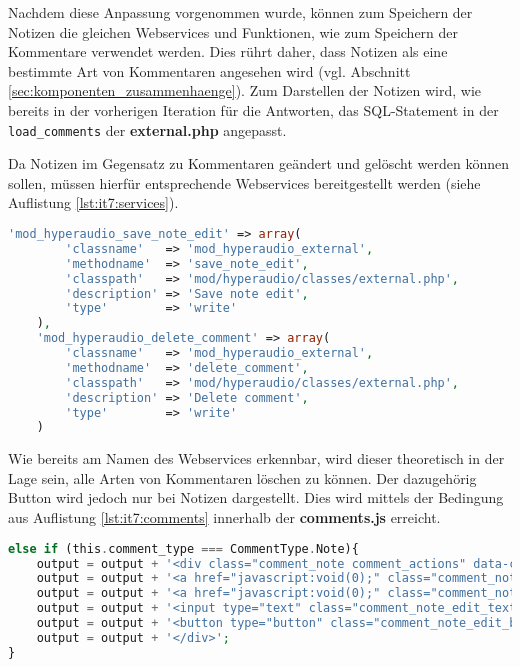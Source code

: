 Nachdem diese Anpassung vorgenommen wurde, können zum Speichern der Notizen die gleichen Webservices und Funktionen, wie zum Speichern der Kommentare verwendet werden. Dies rührt daher, dass Notizen als eine bestimmte Art von Kommentaren angesehen wird (vgl. Abschnitt \ref{sec:komponenten_zusammenhaenge}). Zum Darstellen der Notizen wird, wie bereits in der vorherigen Iteration für die Antworten, das SQL-Statement in der \texttt{load_comments} der \textbf{external.php} angepasst.

Da Notizen im Gegensatz zu Kommentaren geändert und gelöscht werden können sollen, müssen hierfür entsprechende Webservices bereitgestellt werden (siehe Auflistung \ref{lst:it7:services}).

\begin{lstlisting}[language=php,
             linewidth=\textwidth,
             caption={Ausschnitt der \textbf{services.php} in der 7. Iteration},
             label={lst:it7:services}]
'mod_hyperaudio_save_note_edit' => array(
        'classname'   => 'mod_hyperaudio_external',
        'methodname'  => 'save_note_edit',
        'classpath'   => 'mod/hyperaudio/classes/external.php',
        'description' => 'Save note edit',
        'type'        => 'write'
    ),
    'mod_hyperaudio_delete_comment' => array(
        'classname'   => 'mod_hyperaudio_external',
        'methodname'  => 'delete_comment',
        'classpath'   => 'mod/hyperaudio/classes/external.php',
        'description' => 'Delete comment',
        'type'        => 'write'
    )
\end{lstlisting}

 Wie bereits am Namen des Webservices erkennbar, wird dieser theoretisch in der Lage sein, alle Arten von Kommentaren löschen zu können. Der dazugehörig Button wird jedoch nur bei Notizen dargestellt. Dies wird mittels der Bedingung aus Auflistung \ref{lst:it7:comments} innerhalb der \textbf{comments.js} erreicht.
 
\begin{lstlisting}[language=php,
             linewidth=\textwidth,
             caption={Ausschnitt der \textbf{comments.js} in der 7. Iteration},
             label={lst:it7:comments}]
else if (this.comment_type === CommentType.Note){
	output = output + '<div class="comment_note comment_actions" data-comment_id="'+this.id+'">';
	output = output + '<a href="javascript:void(0);" class="comment_note_edit_link comment_link" onclick="show_note_edit_input(this)" data-comment_id="'+this.id+'">' + string_edit + '</a>';
	output = output + '<a href="javascript:void(0);" class="comment_note_delete_link comment_link" data-comment_id="'+this.id+'">' + string_delete + '</a>';
	output = output + '<input type="text" class="comment_note_edit_text comment_hidden_element" data-comment_id="'+this.id+'"/>';
	output = output + '<button type="button" class="comment_note_edit_button comment_hidden_element" data-comment_id="'+this.id+'">' + string_edit + '</button>';
	output = output + '</div>';
}
\end{lstlisting}

